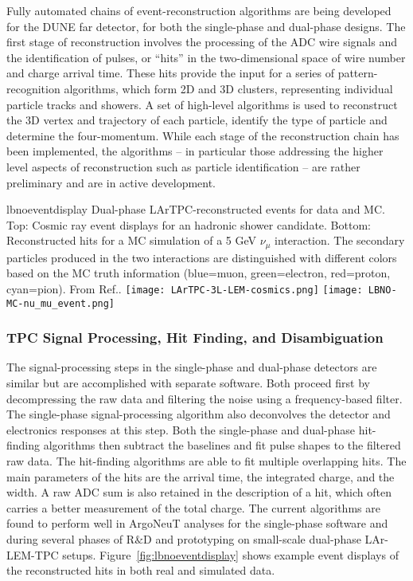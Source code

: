 Fully automated chains of event-reconstruction algorithms are being
developed for the DUNE far detector, for both the single-phase and
dual-phase designs.  The first stage of reconstruction involves the
processing of the ADC wire signals and the identification of pulses,
or ``hits'' in the two-dimensional space of wire number and charge
arrival time.  These hits provide the input for a series of
pattern-recognition algorithms, which form 2D and 3D clusters,
representing individual particle tracks and showers.  A set of
high-level algorithms is used to reconstruct the 3D vertex and
trajectory of each particle, identify the type of particle and
determine the four-momentum.  While each stage of the reconstruction
chain has been implemented, the algorithms -- in particular those
addressing the higher level aspects of reconstruction such as particle
identification -- are rather preliminary and are in active
development.


\begin{cdrfigure}{lbnoeventdisplay}
{
Dual-phase LArTPC-reconstructed events for data and MC.  Top: Cosmic
ray event displays for an hadronic shower candidate.  Bottom:
Reconstructed hits for a MC simulation of a 5 GeV $\nu_{\mu}$
interaction.  The secondary particles produced in the two interactions
are distinguished with different colors based on the MC truth
information (blue=muon, green=electron, red=proton, cyan=pion).  From
Ref.\cite{Badertscher:2012dq}.  }
\texttt{[image: LArTPC-3L-LEM-cosmics.png]}
\texttt{[image: LBNO-MC-nu\_mu\_event.png]}
\end{cdrfigure}

\subsubsection{TPC Signal Processing, Hit Finding, and Disambiguation}

The signal-processing steps in the single-phase and dual-phase
detectors are similar but are accomplished with separate software.
Both proceed first by decompressing the raw data and filtering the
noise using a frequency-based filter.  The single-phase
signal-processing algorithm also deconvolves the detector and
electronics responses at this step.  Both the single-phase and
dual-phase hit-finding algorithms then subtract the baselines and fit
pulse shapes to the filtered raw data.  The hit-finding algorithms are
able to fit multiple overlapping hits.  The main parameters of the
hits are the arrival time, the integrated charge, and the width.  A
raw ADC sum is also retained in the description of a hit, which often
carries a better measurement of the total charge.  The current
algorithms are found to perform well in ArgoNeuT
analyses\cite{Anderson:2012vc} for the single-phase software and
during several phases of R$\&$D and prototyping on small-scale
dual-phase LAr-LEM-TPC
setups\cite{Badertscher:2008rf,Badertscher:2012dq}.
Figure~\ref{fig:lbnoeventdisplay} shows example event displays of the
reconstructed hits in both real and simulated data.

